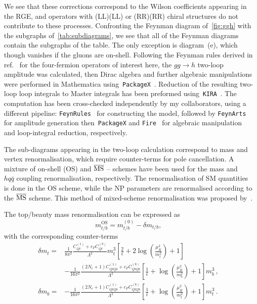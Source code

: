 	\par We see that these corrections correspond to the Wilson coefficients appearing in the RGE, and operators with (LL)(LL) or (RR)(RR) chiral structures do not contribute to these processes. Confronting the Feynman diagram of~\autoref{fig:ggh} with the subgraphs of~\autoref{tab:subdiagrams}, we see that all of the Feynman diagrams contain the subgraphs of the table. The only exception is diagram~(e), which though vanishes if the gluons are on-shell.
	Following the Feynman rules derived in ref.~\cite{Dedes:2017zog} for the four-fermion operators of interest here, the $ gg \to h$ two-loop amplitude was calculated, then Dirac algebra and further algebraic manipulations were performed in Mathematica using~\texttt{PackageX}~\cite{Patel:2015tea}. Reduction of the resulting two-loop loop integrals to Master integrals has been preformed using~\texttt{KIRA}~\cite{Maierhoefer:2017hyi}. The computation has been cross-checked independently by my collaborators, using a different pipeline: \texttt{FeynRules}~\cite{Alloul:2013bka} for constructing the model, followed by \texttt{FeynArts}~\cite{Hahn:2000kx} for amplitude generation then~\texttt{PackageX} and  \texttt{Fire}~\cite{Smirnov:2008iw} for algebraic manipulation and loop-integral reduction, respectively.
	\par
	The sub-diagrams appearing in the two-loop calculation correspond to mass and vertex renormalisation, which require counter-terms for pole cancellation. A mixture of  on-shell (OS) and $\overline{\mathrm{MS}}$ -- schemes have been used for the mass and ~$h q \bar{q}$ coupling renormalisation, respectively. The renormalisation of SM quantities is  done in the OS scheme, while the NP parameters are renormalised according to the $\overline{\mathrm{MS}}$ scheme. This method of mixed-scheme renormalisation was proposed by~\cite{Dawson:2018pyl}.
	\par The top/beauty mass renormalisation can be expressed as  
	\begin{equation}
		m_{t/b}^{\text{OS}}=m_{t/b}^{(0)}-\delta m_{t/b},
	\end{equation}
	with the corresponding counter-terms
	\begin{align}
		\delta m_t =&\frac{1}{8 \pi^2} \frac{C_{Qt}^{(1)}+c_F C_{Qt}^{(8)}}{\Lambda^2}m_t^3\left[ \frac{2}{\bar{\epsilon}} +2 \log\left(\frac{\mu_R^2}{m_t^2}\right)+1\right] \\ &- \frac{1}{16 \pi^2}  \frac{(2 N_c+1) C_{QtQb}^{(1)}+c_F C_{QtQb}^{(8)}}{\Lambda^2}  \left[ \frac{1}{\bar{\epsilon}} +  \log\left(\frac{\mu_R^2}{m_b^2}\right)+1 \right]  m_b^3\,, \nonumber \\
		\delta m_b=&-\frac{1}{16 \pi^2} \frac{(2 N_c+1)C_{QtQb}^{(1)}+c_F C_{QtQb}^{(8)}}{\Lambda^2}\left[ \frac{1}{\bar{\epsilon}} +\log\left( \frac{\mu_R^2}{m_t^2}\right)+1\right] m_t^3\,.
	\end{align}

